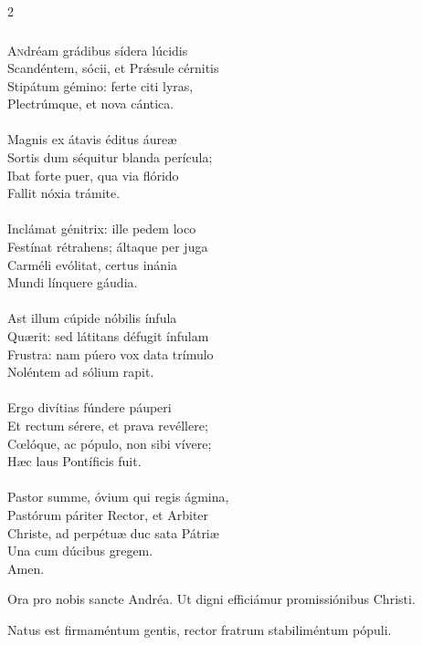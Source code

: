 \documentclass[9pt,twoside]{extarticle}
\begin{document}
\begin{multicols}{2}
\subsubsection*{\center {}}
\lettrine{A}ndréam grádibus sídera lúcidis\\
Scandéntem, sócii, et Prǽsule cérnitis\\
Stipátum gémino: ferte citi lyras,\\
Plectrúmque, et nova cántica.\\
\\
Magnis ex átavis éditus áureæ\\
Sortis dum séquitur blanda perícula;\\
Ibat forte puer, qua via flórido\\
Fallit nóxia trámite.\\
\\
Inclámat génitrix: ille pedem loco\\
Festínat rétrahens; áltaque per juga\\
Carméli evólitat, certus inánia\\
Mundi línquere gáudia.\\
\\
Ast illum cúpide nóbilis ínfula\\
Quærit: sed látitans défugit ínfulam\\
Frustra: nam púero vox data trímulo\\
Noléntem ad sólium rapit.\\
\\
Ergo divítias fúndere páuperi\\
Et rectum sérere, et prava revéllere;\\
Cœlóque, ac pópulo, non sibi vívere;\\
Hæc laus Pontíficis fuit.\\
\\
Pastor summe, óvium qui regis ágmina,\\
Pastórum páriter Rector, et Arbiter\\
Christe, ad perpétuæ duc sata Pátriæ\\
Una cum dúcibus gregem.\\
Amen.

\begin{tightlist}{}
\item {} Ora pro nobis sancte Andréa.  Ut digni efficiámur promissiónibus Christi.
\item {} Natus est firmaméntum gentis, rector fratrum stabiliméntum pópuli.
\end{tightlist}


\end{multicols}
\end{document}
